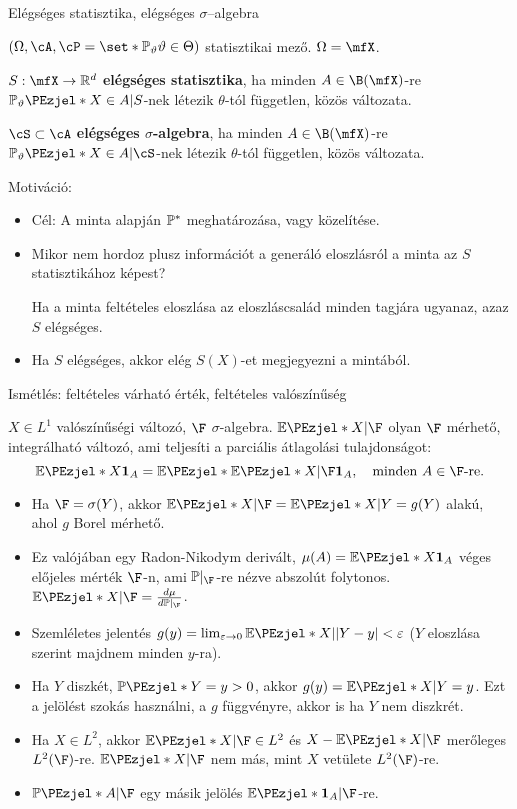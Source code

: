 \documentclass[aspectratio=169,notheorems,9pt,\option]{beamer}
\begin{document}
\begin{frame}{Elégséges statisztika, elégséges $\sigma$--algebra}

  $(\Omega,\cA,\cP=\set*{\P[\theta]}{\theta\in\Theta})$ statisztikai mező. $\Omega=\mfX$.  
  \begin{df} 
    $S:\mfX\to\real^d$ \textbf{elégséges statisztika}, ha minden $A\in\B(\mfX)$-re $\P[\theta]{X\in A|S}$-nek 
    létezik $\theta$-tól független, közös változata.

    $\cS\subset\cA$ \textbf{elégséges $\sigma$-algebra}, ha minden $A\in\B(\mfX)$-re $\P[\theta]{X\in A|\cS}$-nek 
    létezik $\theta$-tól független, közös változata.
  \end{df} 

  \continue
  Motiváció:
  \begin{itemize}
    \item Cél: A minta alapján $\P^*$ meghatározása, vagy közelítése.

    \item Mikor nem hordoz plusz információt a generáló eloszlásról 
    a minta az $S$ statisztikához képest?

    Ha a minta feltételes eloszlása az eloszláscsalád minden tagjára ugyanaz, 
    azaz $S$ elégséges.

    \item Ha $S$ elégséges, akkor elég $S(X)$-et megjegyezni a mintából.
  \end{itemize}
\end{frame}

\begin{frame}{Ismétlés: feltételes várható érték, feltételes valószínűség}
  \begin{df}
    $X\in L^1$ valószínűségi változó, $\F$ $\sigma$-algebra. $\E{X|\F}$ olyan $\F$ mérhető, integrálható változó, ami teljesíti 
    a parciális átlagolási tulajdonságot:
    \begin{displaymath}
      \E{X\I[A]}=\E{\E{X|\F}\I[A]},\quad\text{minden $A\in\F$-re}.
    \end{displaymath}
  \end{df}
  \begin{itemize}
    \item Ha $\F=\sigma(Y)$, akkor $\E{X|\F}=\E{X|Y}=g(Y)$ alakú, ahol $g$ Borel mérhető.
    \item Ez valójában egy Radon-Nikodym derivált, $\mu(A)=\E{X\I[A]}$ véges előjeles mérték $\F$-n, ami $\P|_{\F}$-re 
    nézve abszolút folytonos. $\E{X|\F}=\frac{d\mu}{d\P|_{\F}}$.
    \item Szemléletes jelentés $g(y)=\lim_{\eps\to0}\E{X|\abs*{Y-y}<\eps}$ ($Y$ eloszlása szerint majdnem minden $y$-ra).
    \item Ha $Y$ diszkét, $\P{Y=y}>0$, akkor $g(y)=\E{X|Y=y}$. Ezt a jelölést szokás használni, a $g$ függvényre, akkor is ha $Y$ nem diszkrét.
    \item Ha $X\in L^2$, akkor $\E{X|\F}\in L^2$ és $X-\E{X|\F}$ merőleges $L^2(\F)$-re.
    $\E{X|\F}$ nem más, mint $X$ vetülete $L^2(\F)$-re.
    \item $\P{A|\F}$ egy másik jelölés $\E{\I[A]|\F}$-re.
  \end{itemize}
\end{frame}
\end{document}
